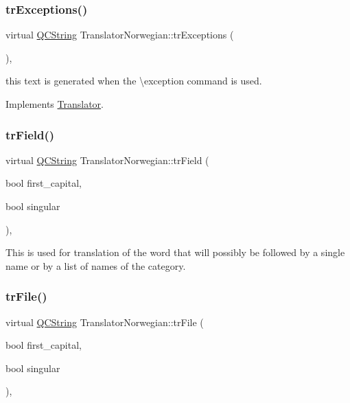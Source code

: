 \subsubsection{\texorpdfstring{trExceptions()}{trExceptions()}}
{\footnotesize\ttfamily virtual \mbox{\hyperlink{class_q_c_string}{Q\+C\+String}} Translator\+Norwegian\+::tr\+Exceptions (\begin{DoxyParamCaption}{ }\end{DoxyParamCaption})\hspace{0.3cm}{\ttfamily [inline]}, {\ttfamily [virtual]}}

this text is generated when the \textbackslash{}exception command is used. 

Implements \mbox{\hyperlink{class_translator}{Translator}}.

\mbox{\label{class_translator_norwegian_abfb0cb97df1bd5efb23308a6fb62ebcd}} 
\subsubsection{\texorpdfstring{trField()}{trField()}}
{\footnotesize\ttfamily virtual \mbox{\hyperlink{class_q_c_string}{Q\+C\+String}} Translator\+Norwegian\+::tr\+Field (\begin{DoxyParamCaption}\item[{bool}]{first\+\_\+capital,  }\item[{bool}]{singular }\end{DoxyParamCaption})\hspace{0.3cm}{\ttfamily [inline]}, {\ttfamily [virtual]}}

This is used for translation of the word that will possibly be followed by a single name or by a list of names of the category. \mbox{\label{class_translator_norwegian_acca696930b1f69826a09951a73821da6}} 
\subsubsection{\texorpdfstring{trFile()}{trFile()}}
{\footnotesize\ttfamily virtual \mbox{\hyperlink{class_q_c_string}{Q\+C\+String}} Translator\+Norwegian\+::tr\+File (\begin{DoxyParamCaption}\item[{bool}]{first\+\_\+capital,  }\item[{bool}]{singular }\end{DoxyParamCaption})\hspace{0.3cm}{\ttfamily [inline]}, {\ttfamily [virtual]}}

